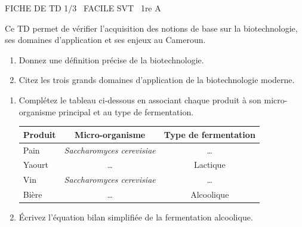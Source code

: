 \documentclass[11pt]{article}
\begin{document}
\begin{tcolorbox}[enhanced,colback=popink,colframe=popink,arc=10pt,boxrule=0pt,left=12pt,right=12pt,top=9pt,bottom=9pt]
{\color{white}\popxbold\small FICHE DE TD 1/3 \textbullet\ FACILE \hfill SVT \textbullet\ 1re A\par}
\end{tcolorbox}
\vspace{4pt}
Ce TD permet de vérifier l'acquisition des notions de base sur la biotechnologie, ses domaines d'application et ses enjeux au Cameroun.

\begin{exercice}
\begin{enumerate}
    \item Donnez une définition précise de la biotechnologie.
    \item Citez les trois grands domaines d'application de la biotechnologie moderne.
\end{enumerate}
\end{exercice}

\begin{exercice}
\begin{enumerate}
    \item Complétez le tableau ci-dessous en associant chaque produit à son micro-organisme principal et au type de fermentation.
    \begin{tabular}{|l|c|c|}
    \hline
    \textbf{Produit} & \textbf{Micro-organisme} & \textbf{Type de fermentation} \\
    \hline
    Pain & \textit{Saccharomyces cerevisiae} & \ldots \\
    \hline
    Yaourt & \ldots & Lactique \\
    \hline
    Vin & \textit{Saccharomyces cerevisiae} & \ldots \\
    \hline
    Bière & \ldots & Alcoolique \\
    \hline
    \end{tabular}
    \item Écrivez l'équation bilan simplifiée de la fermentation alcoolique.
\end{enumerate}
\end{exercice}
\end{document}

